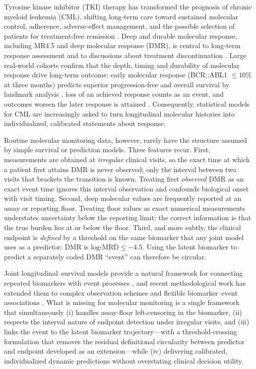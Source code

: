 \documentclass[11pt]{article}
\begin{document}
Tyrosine kinase inhibitor (TKI) therapy has transformed the prognosis of
chronic myeloid leukemia (CML), shifting long-term care toward sustained
molecular control, adherence, adverse-effect management, and the possible
selection of patients for treatment-free remission
\cite{Hochhaus2020ELN,Jabbour2025JAMAReview,Haddad2026Algorithms,Senapati2023CMLManagement}.
Deep and durable molecular response, including MR4.5 and deep molecular
response (DMR), is central to long-term response assessment and to
discussions about treatment discontinuation
\cite{Hughes2014EarlyMolecularResponse,Rasekh2026TFRPredictor,Ono2026MR45,Takahashi2026JSKI}.
Large real-world cohorts confirm that the depth, timing and durability of
molecular response drive long-term outcome: early molecular response
(BCR::ABL1 $\le 10\%$ at three months) predicts superior progression-free and
overall survival by landmark analysis
\cite{Hanfstein2012EMR,Ohm2012Landmark}, loss of an achieved response counts
as an event, and outcomes worsen the later response is attained
\cite{Li2014TKIEfficacy}.
Consequently, statistical models for CML are increasingly asked to turn
longitudinal molecular histories into individualized, calibrated
statements about response.

Routine molecular monitoring data, however, rarely have the structure
assumed by simple survival or prediction models. Three features recur.
First, measurements are obtained at \emph{irregular} clinical visits, so
the exact time at which a patient first attains DMR is never observed;
only the interval between two visits that brackets the transition is
known. Treating first \emph{observed} DMR as an exact event time ignores
this interval observation and confounds biological onset with visit
timing. Second, deep molecular values are frequently reported at an assay
or reporting floor. Treating floor values as exact numerical measurements
understates uncertainty below the reporting limit; the correct
information is that the true burden lies at or below the floor. Third, and
more subtly, the clinical endpoint is \emph{defined} by a threshold on the
same biomarker that any joint model uses as a predictor: DMR is
$\text{log-MRD} \le -4.5$. Using the latent biomarker to predict a
separately coded DMR ``event'' can therefore be circular.

Joint longitudinal--survival models provide a natural framework for
connecting repeated biomarkers with event processes
\cite{Wulfsohn1997JointModel,Rizopoulos2016JMbayes}, and recent
methodological work has extended them to complex observation schemes and
flexible biomarker--event associations
\cite{Lovblom2026MixedObservationJointModel,Niu2026QuantileJointModel}.
What is missing for molecular monitoring is a single framework that
simultaneously (i) handles assay-floor left-censoring in the biomarker,
(ii) respects the interval nature of endpoint detection under irregular
visits, and (iii) links the event to the latent biomarker
trajectory---with a threshold-crossing formulation that removes the residual
definitional circularity between predictor and endpoint developed as an
extension---while (iv) delivering calibrated, individualized dynamic
predictions without overstating clinical decision utility.
\end{document}
